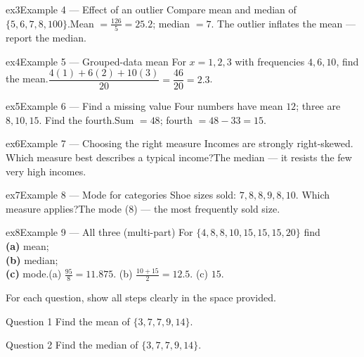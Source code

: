 \documentclass[11pt]{article}
\begin{document}
\begin{example}{ex3}{Example 4 --- Effect of an outlier}
Compare mean and median of $\{5,6,7,8,100\}$.\soln Mean $=\tfrac{126}{5}=25.2$; median $=7$. The outlier inflates the mean --- report the median.
\end{example}

\begin{example}{ex4}{Example 5 --- Grouped-data mean}
For $x=1,2,3$ with frequencies $4,6,10$, find the mean.\soln $\dfrac{4(1)+6(2)+10(3)}{20}=\dfrac{46}{20}=2.3$.
\end{example}

\begin{example}{ex5}{Example 6 --- Find a missing value}
Four numbers have mean $12$; three are $8,10,15$. Find the fourth.\soln Sum $=48$; fourth $=48-33=15$.
\end{example}

\begin{example}{ex6}{Example 7 --- Choosing the right measure}
Incomes are strongly right-skewed. Which measure best describes a typical income?\soln The median --- it resists the few very high incomes.
\end{example}

\begin{example}{ex7}{Example 8 --- Mode for categories}
Shoe sizes sold: $7,8,8,9,8,10$. Which measure applies?\soln The mode ($8$) --- the most frequently sold size.
\end{example}

\begin{example}{ex8}{Example 9 --- All three (multi-part)}
For $\{4,8,8,10,15,15,15,20\}$ find \\ \textbf{(a)} mean; \\ \textbf{(b)} median; \\ \textbf{(c)} mode.\soln (a) $\tfrac{95}{8}=11.875$. (b) $\tfrac{10+15}{2}=12.5$. (c) $15$.
\end{example}

\clearpage
{}
For each question, show all steps clearly in the space provided.

\begin{qbox}{Question 1}
Find the mean of $\{3,7,7,9,14\}$.\workspace{2.4cm}
\end{qbox}

\begin{qbox}{Question 2}
Find the median of $\{3,7,7,9,14\}$.\workspace{2.4cm}
\end{qbox}
\end{document}
